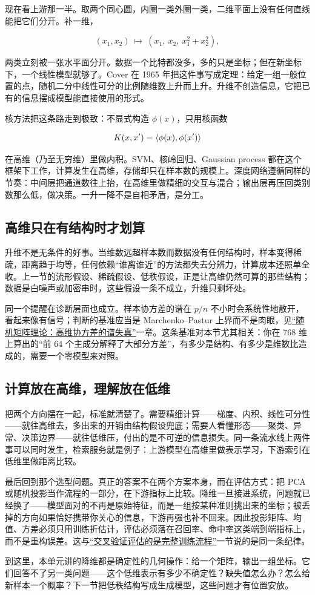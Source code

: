 现在看上游那一半。取两个同心圆，内圈一类外圈一类，二维平面上没有任何直线能把它们分开。补一维，

\[
(x_1,x_2)\ \longmapsto\ (x_1,\ x_2,\ x_1^2+x_2^2),
\]

两类立刻被一张水平面分开。数据一个比特都没多，多的只是坐标；但在新坐标下，一个线性模型就够了。Cover 在 1965 年把这件事写成定理：给定一组一般位置的点，随机二分中线性可分的比例随维数上升而上升。升维不创造信息，它把已有的信息摆成模型能直接使用的形式。

核方法把这条路走到极致：不显式构造 \(\phi(x)\)，只用核函数

\[
K(x,x') = \left\langle\phi(x),\phi(x')\right\rangle
\]

在高维（乃至无穷维）里做内积。SVM、核岭回归、Gaussian process 都在这个框架下工作，计算发生在高维，存储却只在样本数的规模上。深度网络遵循同样的节奏：中间层把通道数往上抬，在高维里做精细的交互与混合；输出层再压回类别数那么低，做决策。一升一降不是自相矛盾，是分工。

\subsection{高维只在有结构时才划算}

升维不是无条件的好事。当维数远超样本数而数据没有任何结构时，样本变得稀疏，距离趋于均等，任何依赖``谁离谁近''的方法都失去分辨力，计算成本还照单全收。上一节的流形假设、稀疏假设、低秩假设，正是让高维仍然可算的那些结构；数据是白噪声或加密串时，这些假设一条不成立，升维只剩坏处。

同一个提醒在诊断层面也成立。样本协方差的谱在 \(p/n\) 不小时会系统性地散开，看起来像有信号；判断的基准应当是 Marchenko--Pastur 上界而不是肉眼，见\hyperref[ch:094]{``随机矩阵理论：高维协方差的谱失真''}一章。这条基准对本节尤其相关：你在 768 维上算出的``前 64 个主成分解释了大部分方差''，有多少是结构、有多少是维数比造成的，需要一个零模型来对照。

\subsection{计算放在高维，理解放在低维}

把两个方向摆在一起，标准就清楚了。需要精细计算——梯度、内积、线性可分性——就往高维去，多出来的开销由结构假设兜底；需要人看懂形态——聚类、异常、决策边界——就往低维压，付出的是不可逆的信息损失。同一条流水线上两件事可以同时发生，检索服务就是例子：上游模型在高维里做表示学习，下游索引在低维里做距离比较。

最后回到那个选型问题。真正的答案不在两个方案本身，而在评估方式：把 PCA 或随机投影当作流程的一部分，在下游指标上比较。降维一旦接进系统，问题就已经换了——模型面对的不再是原始特征，而是一组按某种准则挑出来的坐标；被丢掉的方向如果恰好携带你关心的信息，下游再强也补不回来。因此投影矩阵、均值、方差必须只用训练折估计，评估必须落在召回率、命中率这类端到端指标上，而不是重构误差。这与\hyperref[sec:11-Mathematical-Statistics/06-Resampling-and-Model-Selection/03]{``交叉验证评估的是完整训练流程''}一节说的是同一条纪律。

到这里，本单元讲的降维都是确定性的几何操作：给一个矩阵，输出一组坐标。它们回答不了另一类问题——这个低维表示有多少不确定性？缺失值怎么办？怎么给新样本一个概率？下一节把低秩结构写成生成模型，这些问题才有位置安放。
